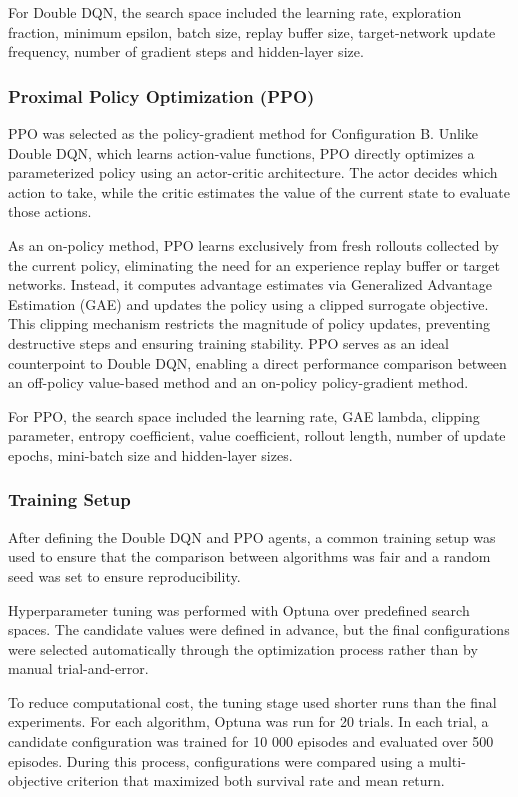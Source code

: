 \documentclass[11pt,a4paper]{article}
\begin{document}
For Double DQN, the search space included the learning rate, exploration fraction, minimum epsilon, batch size, replay buffer size, 
target-network update frequency, number of gradient steps and hidden-layer size.

\subsubsection{Proximal Policy Optimization (PPO)}

PPO was selected as the policy-gradient method for Configuration B. Unlike Double DQN, which learns action-value functions, 
PPO directly optimizes a parameterized policy using an actor-critic architecture. 
The actor decides which action to take, while the critic estimates the value of the current state to evaluate those actions.

As an on-policy method, PPO learns exclusively from fresh rollouts collected by the current policy, 
eliminating the need for an experience replay buffer or target networks. 
Instead, it computes advantage estimates via Generalized Advantage Estimation (GAE) and updates the policy using a clipped surrogate objective. 
This clipping mechanism restricts the magnitude of policy updates, preventing destructive steps and ensuring training stability. 
PPO serves as an ideal counterpoint to Double DQN, enabling a direct performance comparison between an off-policy value-based method 
and an on-policy policy-gradient method.

For PPO, the search space included the learning rate, GAE lambda, clipping parameter, entropy coefficient, value coefficient, 
rollout length, number of update epochs, mini-batch size and hidden-layer sizes.


\subsubsection{Training Setup}

After defining the Double DQN and PPO agents, a common training setup was used to ensure that the comparison between algorithms 
was fair and a random seed was set to ensure reproducibility.

Hyperparameter tuning was performed with Optuna over predefined search spaces. 
The candidate values were defined in advance, but the final configurations were selected automatically 
through the optimization process rather than by manual trial-and-error. 

To reduce computational cost, the tuning stage used shorter runs than the final experiments. 
For each algorithm, Optuna was run for 20 trials. 
In each trial, a candidate configuration was trained for 10 000 episodes and evaluated over 500 episodes. 
During this process, configurations were compared using a multi-objective criterion that maximized both survival rate and mean return.
\end{document}
